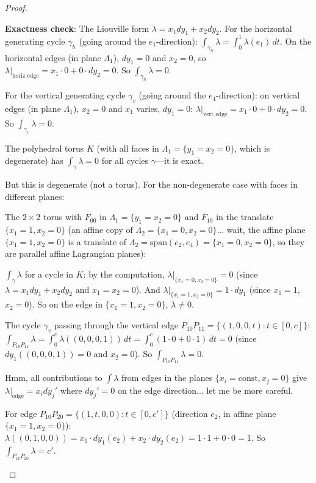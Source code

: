 \documentclass[12pt]{article}
\theoremstyle{definition}
\begin{document}
\begin{proof}
\begin{itemize}
\textbf{Exactness check}: The Liouville form $\lambda = x_1 dy_1 + x_2 dy_2$. For the horizontal generating cycle $\gamma_h$ (going around the $e_1$-direction): $\int_{\gamma_h}\lambda = \int_0^1\lambda(e_1)\,dt$. On the horizontal edges (in plane $\Lambda_1$), $dy_1 = 0$ and $x_2 = 0$, so $\lambda|_{\text{horiz edge}} = x_1\cdot 0 + 0\cdot dy_2 = 0$. So $\int_{\gamma_h}\lambda = 0$.

For the vertical generating cycle $\gamma_v$ (going around the $e_4$-direction): on vertical edges (in plane $\Lambda_1$), $x_2 = 0$ and $x_1$ varies, $dy_1 = 0$: $\lambda|_{\text{vert edge}} = x_1\cdot 0 + 0\cdot dy_2 = 0$. So $\int_{\gamma_v}\lambda = 0$.

The polyhedral torus $K$ (with all faces in $\Lambda_1 = \{y_1=x_2=0\}$, which is degenerate) has $\int_\gamma\lambda = 0$ for all cycles $\gamma$—it is exact.

But this is degenerate (not a torus). For the non-degenerate case with faces in different planes:

The $2\times 2$ torus with $F_{00}$ in $\Lambda_1 = \{y_1=x_2=0\}$ and $F_{10}$ in the translate $\{x_1=1,x_2=0\}$ (an affine copy of $\Lambda_2 = \{x_1=0,x_2=0\}$... wait, the affine plane $\{x_1=1,x_2=0\}$ is a translate of $\Lambda_2 = \mathrm{span}(e_2,e_4) = \{x_1=0,x_2=0\}$, so they are parallel affine Lagrangian planes):

$\int_{\gamma}\lambda$ for a cycle in $K$: by the computation, $\lambda|_{\{x_1=0,x_2=0\}} = 0$ (since $\lambda = x_1 dy_1 + x_2 dy_2$ and $x_1=x_2=0$). And $\lambda|_{\{x_1=1,x_2=0\}} = 1\cdot dy_1$ (since $x_1=1$, $x_2=0$). So on the edge in $\{x_1=1,x_2=0\}$, $\lambda\neq 0$.

The cycle $\gamma_v$ passing through the vertical edge $P_{10}P_{11} = \{(1,0,0,t) : t\in[0,c]\}$:
$\int_{P_{10}P_{11}}\lambda = \int_0^c\lambda((0,0,0,1))\,dt = \int_0^c(1\cdot 0+0\cdot 1)\,dt = 0$ (since $dy_1((0,0,0,1)) = 0$ and $x_2 = 0$). So $\int_{P_{10}P_{11}}\lambda = 0$.

Hmm, all contributions to $\int\lambda$ from edges in the planes $\{x_i = \text{const}, x_j = 0\}$ give $\lambda|_{\text{edge}} = x_i dy_j'$ where $dy_j' = 0$ on the edge direction... let me be more careful.

For edge $P_{10}P_{20} = \{(1,t,0,0) : t\in[0,c']\}$ (direction $e_2$, in affine plane $\{x_1=1,x_2=0\}$):
$\lambda((0,1,0,0)) = x_1\cdot dy_1(e_2) + x_2\cdot dy_2(e_2) = 1\cdot 1 + 0\cdot 0 = 1$.
So $\int_{P_{10}P_{20}}\lambda = c'$.


\end{itemize}
\end{proof}
\end{document}
